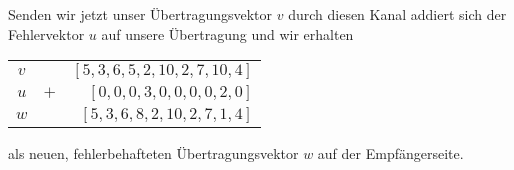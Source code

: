Senden wir jetzt unser Übertragungsvektor $v$ durch diesen Kanal addiert sich der Fehlervektor $u$ auf unsere Übertragung und wir erhalten 
\begin{center}
	
	\begin{tabular}{c | c r }
		$v$ & & $[5,3,6,5,2,10,2,7,10,4]$\\
		$u$ & $+$ & $[0,0,0,3,0,0,0,0,2,0]$\\
		\hline
		$w$ & & $[5,3,6,8,2,10,2,7,1,4]$\\
	\end{tabular}
	
	
\end{center}
als neuen, fehlerbehafteten Übertragungsvektor $w$ auf der Empfängerseite.
%
%
%
%
%
%
%
%
%
